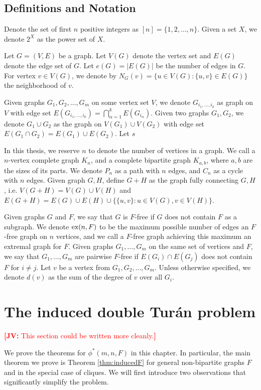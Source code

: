 \documentclass[12pt]{article}
\newcommand{\jv}[1]{\textcolor{red}{\textbf{[JV: } #1\textbf{]}}}
\newcommand*{\ex}{\textnormal{ex}}
\begin{document}
\subsection{Definitions and Notation}

Denote the set of first $n$ positive integers as $[n] = \{1, 2, \ldots, n\}$. Given a set $X$, we denote $2^X$ as the power set of $X$.

Let $G = (V, E)$ be a graph. Let $V(G)$ denote the vertex set and $E(G)$ denote the edge set of $G$. Let $e(G) = |E(G)|$ be the number of edges in $G$. For vertex $v \in V(G)$, we denote by $N_G(v) = \{u \in V(G) : \{u, v\} \in E(G)\}$ the neighborhood of $v$.

Given graphs $G_1,G_2, \ldots, G_m$ on some vertex set $V$, we denote $G_{i_1, \ldots, i_k}$ as graph on $V$ with edge set $E(G_{i_1, \ldots, i_k}) = \bigcap_{\alpha = 1}^k E(G_{i_\alpha})$. Given two graphs $G_1, G_2$, we denote $G_1 \cup G_2$ as the graph on $V(G_1) \cup V(G_2)$ with edge set $E(G_1 \cap G_2) = E(G_1) \cup E(G_2)$. Let $s$

In this thesis, we reserve $n$ to denote the number of vertices in a graph. We call a $n$-vertex complete graph $K_n$, and a complete bipartite graph $K_{a, b}$, where $a, b$ are the sizes of its parts. We denote $P_n$ as a path with $n$ edges, and $C_n$ as a cycle with $n$ edges. Given graph $G, H$, define $G + H$ as the graph fully connecting $G, H$, i.e. $V(G + H) = V(G) \cup V(H)$ and $E(G + H) = E(G) \cup E(H) \cup \{\{u, v\} : u \in V(G), v \in V(H)\}$.

Given graphs $G$ and $F$, we say that $G$ is $F$-free if $G$ does not contain $F$ as a subgraph. We denote $\ex(n, F)$ to be the maximum possible number of edges an $F$-free graph on $n$ vertices, and we call a $F$-free graph achieving this maximum an extremal graph for $F$. Given graphs $G_1, \ldots, G_m$ on the same set of vertices and $F$, we say that $G_1, \ldots, G_m$ are pairwise $F$-free if $E(G_i) \cap E(G_j)$ does not contain $F$ for $i \neq j$. Let $v$ be a vertex from $G_1, G_2, \ldots, G_m$. Unless otherwise specified, we denote $d(v)$ as the sum of the degree of $v$ over all $G_i$.

\section{The induced double Tur\'{a}n problem}

\jv{This section could be written more cleanly.}

We prove the theorems for $\phi^*(m, n ,F)$ in this chapter. In particular, the main theorem we prove is Theorem \ref{thm:inducedF} for general non-bipartite graphs $F$ and in the special case of cliques. We will first introduce two observations that significantly simplify the problem.
\end{document}
